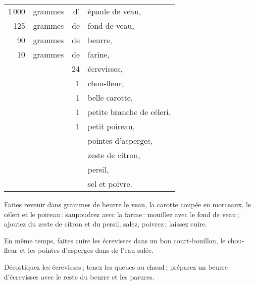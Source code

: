 \footnotesize
\begin{longtable}{rrrp{16em}}
  1 000 & grammes & d' & épaule de veau,                                                                  \\
    125 & grammes & de & fond de veau,                                                                    \\
     90 & grammes & de & beurre,                                                                          \\
     10 & grammes & de & farine,                                                                          \\
        &         & 24 & écrevisses,                                                                      \\
        &         &  1 & chou-fleur,                                                                      \\
        &         &  1 & belle carotte,                                                                   \\
        &         &  1 & petite branche de céleri,                                                        \\
        &         &  1 & petit poireau,                                                                   \\
        &         &    & pointes d'asperges,                                                              \\
        &         &    & zeste de citron,                                                                 \\
        &         &    & persil,                                                                          \\
        &         &    & sel et poivre.                                                                   \\
\end{longtable}
\normalsize

Faites revenir dans {\mmm} grammes de beurre le veau, la carotte coupée en
morceaux, le céleri et le poireau : saupoudrez avec la farine : mouillez avec
le fond de veau ; ajoutez du zeste de citron et du persil, salez, poivrez ;
laissez cuire.

En même temps, faites cuire les écrevisses dans un bon court-bouillon, le
chou-fleur et les pointes d'asperges dans de l'eau salée.

Décortiquez les écrevisses ; tenez les queues au chaud ; préparez un beurre
d'écrevisses avec le reste du beurre et les parures.

